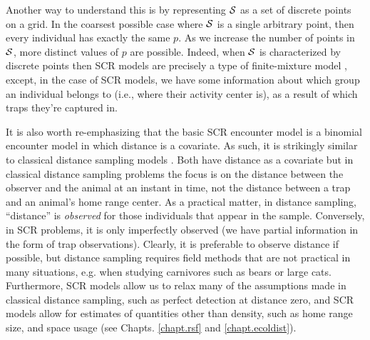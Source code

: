 Another way to understand this is by representing ${\cal S}$ as a set
of discrete points on a grid. In the coarsest possible case where
${\cal S}$ is a single arbitrary point, then every individual has
exactly the same $p$. As we increase the number of points in ${\cal
  S}$,  more distinct values of $p$ are possible. Indeed, when
${\cal S}$ is characterized by discrete points then SCR models are
precisely a type of finite-mixture model \citep{norris_pollock:1996,
  pledger:2000}, except, in the case of SCR models, we have some information about which
group an individual belongs to (i.e., where their activity center is), as
a result of which traps they're captured in.

It is also worth re-emphasizing that the basic SCR encounter model is a binomial
encounter model in which distance is a covariate. As such, it is
strikingly similar to classical distance sampling models
\citep{buckland_etal:2001}. Both have distance as a covariate but in
classical distance sampling problems the focus is on the distance
between the observer and the animal at an instant in time, not the
distance between a trap and an animal's home range center. As a
practical matter, in distance sampling, ``distance'' is {\it observed}
for those individuals that appear in the sample. Conversely, in SCR
problems, it is only imperfectly observed (we have partial information
in the form of trap observations).  Clearly, it is preferable to
observe distance if possible, but distance sampling requires field
methods that are not practical in many situations, e.g. when
studying carnivores such as bears or large cats. Furthermore, SCR
models allow us to relax many of the assumptions made in classical
distance sampling, such as perfect detection at distance zero, and SCR
models allow for estimates of quantities other than density, such as
home range size, and space usage (see Chapts. \ref{chapt.rsf} and
\ref{chapt.ecoldist}).
















